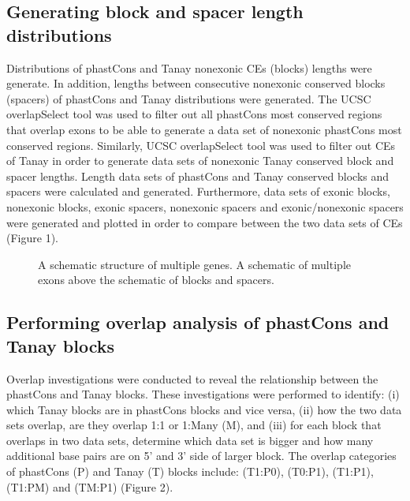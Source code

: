 \documentclass[12pt]{report}
\begin{document}
\subsection{Generating block and spacer length distributions}
Distributions of phastCons and Tanay nonexonic CEs (blocks) lengths were generate. In addition, lengths between consecutive nonexonic conserved blocks (spacers) of phastCons and Tanay distributions were generated. The UCSC overlapSelect tool was used to filter out all phastCons most conserved regions that overlap exons to be able to generate a data set of nonexonic phastCons most conserved regions. Similarly, UCSC overlapSelect tool was used to filter out CEs of Tanay in order to generate data sets of nonexonic Tanay conserved block and spacer lengths. Length data sets of phastCons and Tanay conserved blocks and spacers were calculated and generated. Furthermore, data sets of exonic blocks, nonexonic blocks, exonic spacers, nonexonic spacers and exonic/nonexonic spacers were generated and plotted in order to compare between the two data sets of CEs (Figure 1).\\

\begin{figure}[htbp]
\centering
{}
\caption{A schematic structure of multiple genes. A schematic of multiple exons above the schematic of blocks and spacers.}
\label{fig:gene_structure}
\end{figure}

\subsection{Performing overlap analysis of phastCons and Tanay blocks}
Overlap investigations were conducted to reveal the relationship between the phastCons and Tanay blocks. These investigations were performed to identify: (i) which Tanay blocks are in phastCons blocks and vice versa, (ii) how the two data sets overlap, are they overlap 1:1 or 1:Many (M), and (iii) for each block that overlaps in two data sets, determine which data set is bigger and how many additional base pairs are on 5' and 3' side of larger block. The overlap categories of phastCons (P) and Tanay (T) blocks include: (T1:P0), (T0:P1), (T1:P1), (T1:PM) and (TM:P1) (Figure 2).\\
\end{document}
